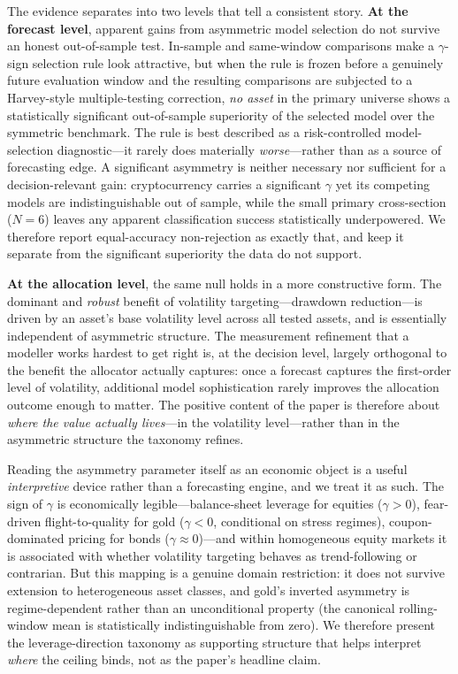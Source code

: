 The evidence separates into two levels that tell a consistent story. \textbf{At the forecast level}, apparent gains from asymmetric model selection do not survive an honest out-of-sample test. In-sample and same-window comparisons make a $\gamma$-sign selection rule look attractive, but when the rule is frozen before a genuinely future evaluation window and the resulting comparisons are subjected to a Harvey-style multiple-testing correction, \emph{no asset} in the primary universe shows a statistically significant out-of-sample superiority of the selected model over the symmetric benchmark. The rule is best described as a risk-controlled model-selection diagnostic---it rarely does materially \emph{worse}---rather than as a source of forecasting edge. A significant asymmetry is neither necessary nor sufficient for a decision-relevant gain: cryptocurrency carries a significant $\gamma$ yet its competing models are indistinguishable out of sample, while the small primary cross-section ($N=6$) leaves any apparent classification success statistically underpowered. We therefore report equal-accuracy non-rejection as exactly that, and keep it separate from the significant superiority the data do not support.

\textbf{At the allocation level}, the same null holds in a more constructive form. The dominant and \emph{robust} benefit of volatility targeting---drawdown reduction---is driven by an asset's base volatility level across all tested assets, and is essentially independent of asymmetric structure. The measurement refinement that a modeller works hardest to get right is, at the decision level, largely orthogonal to the benefit the allocator actually captures: once a forecast captures the first-order level of volatility, additional model sophistication rarely improves the allocation outcome enough to matter. The positive content of the paper is therefore about \emph{where the value actually lives}---in the volatility level---rather than in the asymmetric structure the taxonomy refines.

Reading the asymmetry parameter itself as an economic object is a useful \emph{interpretive} device rather than a forecasting engine, and we treat it as such. The sign of $\gamma$ is economically legible---balance-sheet leverage for equities ($\gamma>0$), fear-driven flight-to-quality for gold ($\gamma<0$, conditional on stress regimes), coupon-dominated pricing for bonds ($\gamma\approx0$)---and within homogeneous equity markets it is associated with whether volatility targeting behaves as trend-following or contrarian. But this mapping is a genuine domain restriction: it does not survive extension to heterogeneous asset classes, and gold's inverted asymmetry is regime-dependent rather than an unconditional property (the canonical rolling-window mean is statistically indistinguishable from zero). We therefore present the leverage-direction taxonomy as supporting structure that helps interpret \emph{where} the ceiling binds, not as the paper's headline claim.

